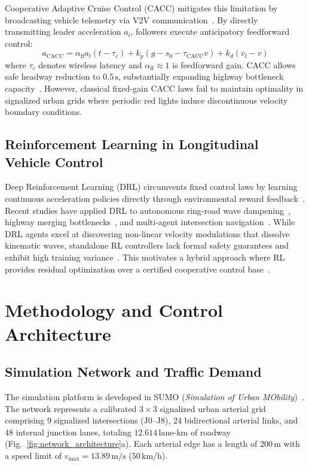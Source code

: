 \documentclass[11pt,a4paper]{article}
\begin{document}
Cooperative Adaptive Cruise Control (CACC) mitigates this limitation by broadcasting vehicle telemetry via V2V communication~\cite{Naus2010, Talebpour2016}. By directly transmitting leader acceleration $a_{l}$, followers execute anticipatory feedforward control:
\begin{equation}
a_{\text{CACC}} = \alpha_{\text{ff}} a_l(t - \tau_c) + k_p (g - s_0 - \tau_{\text{CACC}} v) + k_d (v_l - v)
\label{eq:cacc_law}
\end{equation}
where $\tau_c$ denotes wireless latency and $\alpha_{\text{ff}} \approx 1$ is feedforward gain. CACC allows safe headway reduction to $0.5\,\mathrm{s}$, substantially expanding highway bottleneck capacity~\cite{vanarem2006cacc, Zhou2025}. However, classical fixed-gain CACC laws fail to maintain optimality in signalized urban grids where periodic red lights induce discontinuous velocity boundary conditions.

\subsection{Reinforcement Learning in Longitudinal Vehicle Control}
Deep Reinforcement Learning (DRL) circumvents fixed control laws by learning continuous acceleration policies directly through environmental reward feedback~\cite{Schulman2017, Mnih2015}. Recent studies have applied DRL to autonomous ring-road wave dampening~\cite{Kreidieh2018, Wu2021}, highway merging bottlenecks~\cite{Vinitsky2018}, and multi-agent intersection navigation~\cite{Chu2020, Peake2020}. While DRL agents excel at discovering non-linear velocity modulations that dissolve kinematic waves, standalone RL controllers lack formal safety guarantees and exhibit high training variance~\cite{Zhu2020, Shi2021}. This motivates a hybrid approach where RL provides residual optimization over a certified cooperative control base~\cite{Kanipakam2024, Li2022}.

\section{Methodology and Control Architecture}

\subsection{Simulation Network and Traffic Demand}
The simulation platform is developed in SUMO (\textit{Simulation of Urban MObility})~\cite{krajzewicz2012sumo}. The network represents a calibrated $3\times3$ signalized urban arterial grid comprising 9 signalized intersections (J0--J8), 24 bidirectional arterial links, and 48 internal junction lanes, totaling $12.614\,\text{lane-km}$ of roadway (Fig.~\ref{fig:network_architecture}a). Each arterial edge has a length of $200\,\mathrm{m}$ with a speed limit of $v_{\max} = 13.89\,\mathrm{m/s}$ ($50\,\mathrm{km/h}$).
\end{document}
